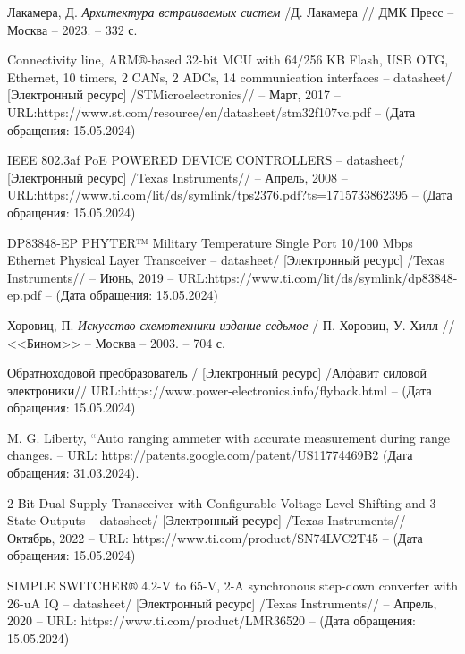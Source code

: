 \begin{thebibliography}{00}


 Лакамера, Д.
\emph{Архитектура встраиваемых систем} /Д. Лакамера // ДМК Пресс --
Москва -- 2023. -- 332 с.

 Connectivity line, ARM®-based 32-bit MCU with 64/256 KB Flash,
 USB OTG, Ethernet, 10 timers, 2 CANs, 2 ADCs, 14 communication interfaces -- datasheet/
  [Электронный ресурс]
 /STMicroelectronics// -- Март, 2017 -- 
 URL:https://www.st.com/resource/en/datasheet/stm32f107vc.pdf --
 (Дата обращения: 15.05.2024)

 IEEE 802.3af PoE POWERED DEVICE CONTROLLERS -- datasheet/
  [Электронный ресурс] /Texas Instruments// -- Апрель, 2008 
  -- URL:https://www.ti.com/lit/ds/symlink/tps2376.pdf?ts=1715733862395 --
  (Дата обращения: 15.05.2024)

 DP83848-EP PHYTER™ Military Temperature Single Port
   10/100 Mbps Ethernet
  Physical Layer Transceiver -- datasheet/
  [Электронный ресурс] /Texas Instruments// -- Июнь, 2019 
  -- URL:https://www.ti.com/lit/ds/symlink/dp83848-ep.pdf --
  (Дата обращения: 15.05.2024)

 Хоровиц, П.
\emph{Искусство схемотехники издание седьмое} / П. Хоровиц, У. Хилл // <<Бином>> --
Москва -- 2003. -- 704 с.

 Обратноходовой преобразователь /
  [Электронный ресурс] /Алфавит силовой электроники// 
   URL:https://www.power-electronics.info/flyback.html --
  (Дата обращения: 15.05.2024)

 M. G. Liberty, “Auto ranging ammeter with accurate measurement 
during range changes. -- URL:
https://patents.google.com/patent/US11774469B2 (Дата обращения: 31.03.2024).

 2-Bit Dual Supply Transceiver with Configurable 
Voltage-Level Shifting and 3-State Outputs
 -- datasheet/
  [Электронный ресурс] /Texas Instruments// -- Октябрь, 2022 -- 
  URL: https://www.ti.com/product/SN74LVC2T45
   -- (Дата обращения: 15.05.2024)

 SIMPLE SWITCHER® 4.2-V to 65-V, 
2-A synchronous step-down converter with 26-uA IQ
  -- datasheet/
  [Электронный ресурс] /Texas Instruments// -- Апрель, 2020 -- 
  URL: https://www.ti.com/product/LMR36520
  -- (Дата обращения: 15.05.2024)


\end{thebibliography}
